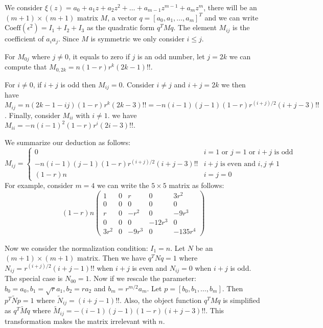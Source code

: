 \documentclass{article}
\begin{document}
We consider $\xi(z) = a_0 + a_1 z + a_2 z^2 + \dots + a_{m-1} z^{m-1} + a_m z^m $, there will be an $(m+1) \times (m+1) $ matrix $M$, a vector  $q = [a_0, a_1, \dots, a_m]^T$ and  we can write $\textrm{Coeff}(\epsilon^2) = I_1 + I_2 + I_3$ as the quadratic form $ q^T M q $. The element $M_{ij}$ is the coefficient of $a_ia_j$. Since $M$ is symmetric we only consider $i\leq j$.

For $M_{0j}$ where $j \neq 0$, it equals to zero if $j$ is an odd number, let $j=2k$ we can compute that $M_{0,2k}=n (1-r)r^k (2k-1)!! $. 

For $i \neq 0$, if $i+j$ is odd then $M_{ij} = 0$. Consider $i \neq j$ and $i+j = 2k$ we then have $M_{ij} = n(2k-1-ij) (1-r)r^k (2k-3)!! = -n(i-1)(j-1) (1-r)r^{(i+j)/ 2 } (i+j-3)!!$. Finally, consider $M_{ii}$ with $i \neq 1$. we have $M_{ii} = 
-n(i-1)^2 (1-r)r^i (2i-3)!!$.

We summarize our deduction as follows:
\begin{equation}
M_{ij} = \begin{cases} 0 & i=1 \textrm{ or } j=1 \textrm{ or } i + j \textrm{ is odd} \\
 -n(i-1)(j-1) (1-r)r^{(i+j)/ 2 } (i+j-3)!! & i+j \textrm{ is even and } i,j \neq 1 \\
(1-r)n & i=j=0
\end{cases}
\end{equation}
For example, consider $m = 4$ we can write the $ 5 \times 5 $ matrix as follows:
$$
(1-r)n\begin{pmatrix}
1 & 0 & r  & 0 & 3r^2\\
0 & 0 & 0  & 0 & 0\\
r &  0 & - r^2 & 0 & -9 r^3 \\
0 & 0 & 0 & -12r^3 & 0 \\
3r^2 & 0 & -9 r^3 & 0 & -135r^4 
\end{pmatrix}
$$

Now we consider the normalization condition: $I_1 = n$. Let $N$ be an $(m+1) \times (m+1)$ matrix.
Then we have $q^T N q = 1$ where $N_{ij} =r^{(i+j) / 2} (i+j -1)!!$ when $i+j$ is even and $N_{ij} = 0$ when $i+j$ is odd. The special case is $N_{00} = 1$. Now if we rescale the parameter: $b_0 =  a_0, b_1 = \sqrt{r} a_1, b_2 = r a_2$ and $b_m = r^{m/2} a_m$. Let $p = [b_0, b_1, \dots, b_m]$. Then $p^T \widetilde{N} p =1$ where $\widetilde{N}_{ij} =  (i+j -1)!!$. Also, the object function $q^T M q$ is simplified as $q^T \widetilde{M} q$ where $\widetilde{M}_{ij} =  -(i-1)(j-1)(1-r) (i+j-3)!! $. This transformation makes the matrix irrelevant with $n$.
\end{document}
